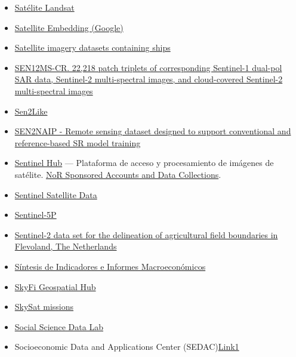 \documentclass[
  letterpaper,
  DIV=11,
  numbers=noendperiod]{scrartcl}
\begin{document}
\begin{itemize}
\item
  \href{https://aws.amazon.com/public-data-sets/landsat/}{Satélite
  Landsat}
\item
  \href{https://developers.google.com/earth-engine/datasets/catalog/GOOGLE_SATELLITE_EMBEDDING_V1_ANNUAL?hl=es-419\#description}{Satellite
  Embedding (Google)}
\item
  \href{https://github.com/jasonmanesis/Satellite-Imagery-Datasets-Containing-Ships}{Satellite
  imagery datasets containing ships}
\item
  \href{https://mediatum.ub.tum.de/1554803}{SEN12MS-CR. 22,218 patch
  triplets of corresponding Sentinel-1 dual-pol SAR data, Sentinel-2
  multi-spectral images, and cloud-covered Sentinel-2 multi-spectral
  images}
\item
  \href{https://docs.openeo.cloud/usecases/ard/sen2like/\#_1-sen2like-for-rgb}{Sen2Like}
\item
  \href{https://huggingface.co/datasets/isp-uv-es/SEN2NAIP}{SEN2NAIP -
  Remote sensing dataset designed to support conventional and
  reference-based SR model training}
\item
  \href{https://www.sentinel-hub.com/}{Sentinel Hub} --- Plataforma de
  acceso y procesamiento de imágenes de satélite.
  \href{https://www.sentinel-hub.com/Network-of-Resources/}{NoR
  Sponsored Accounts and Data Collections}.
\item
  \href{https://browser.dataspace.copernicus.eu}{Sentinel Satellite
  Data}
\item
  \href{https://developers.google.com/earth-engine/datasets/catalog/sentinel-5p}{Sentinel-5P}
\item
  \href{https://phys-techsciences.datastations.nl/dataset.xhtml?persistentId=doi:10.17026/dans-x8d-p6zm}{Sentinel-2
  data set for the delineation of agricultural field boundaries in
  Flevoland, The Netherlands}
\item
  \href{https://portal.mineco.gob.es/es-es/economiayempresa/EconomiaInformesMacro/Paginas/EconomiaInformesMacro.aspx}{Síntesis
  de Indicadores e Informes Macroeconómicos}
\item
  \href{https://skyfi.com/}{SkyFi Geospatial Hub}
\item
  \href{https://earth.esa.int/eogateway/missions/skysat}{SkySat
  missions}
\item
  \href{https://github.com/SocialScienceDataLab/}{Social Science Data
  Lab}
\item
  Socioeconomic Data and Applications Center
  (SEDAC)\href{https://sedac.ciesin.columbia.edu/data/collection/gpw-v4/sets/browse}{Link1}

\end{itemize}
\end{document}
